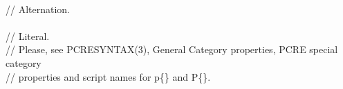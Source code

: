 \begin{bigbigpre}
 \\
// Alternation. \\
 \\
// Literal. \\
// Please, see PCRESYNTAX(3), General Category properties, PCRE special category \\
// properties and script names for \bslash{}p\{\} and \bslash{}P\{\}. \\

\end{bigbigpre}
